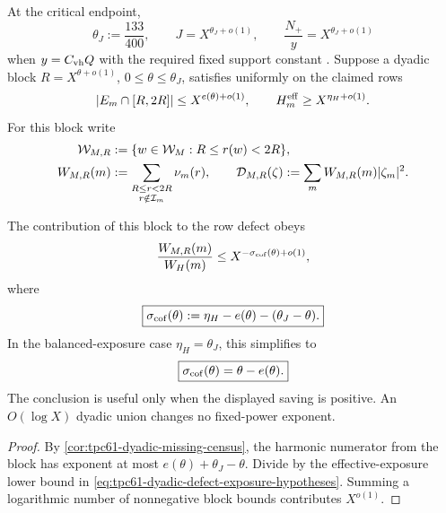 At the critical endpoint,
\begin{equation}
 \theta_J:=\frac{133}{400},
 \qquad
 J=X^{\theta_J+o(1)},
 \qquad
 \frac{N_+}{y}=X^{\theta_J+o(1)}
 \label{eq:tpc61-critical-J-exponent}
\end{equation}
when \(y=C_{\rm vh}Q\) with the required fixed support constant
\citep{WangTPC59}.  Suppose a dyadic block
\(R=X^{\theta+o(1)}\), \(0\le\theta\le\theta_J\), satisfies uniformly
on the claimed rows
\begin{equation}
 |E_m\cap[R,2R]|\le X^{e(\theta)+o(1)},
 \qquad
 H_m^{\rm eff}\ge X^{\eta_H+o(1)}.
 \label{eq:tpc61-dyadic-defect-exposure-hypotheses}
\end{equation}
For this block write
\begin{align}
 \mathcal W_{M,R}
 &:=\{w\in\mathcal W_M:R\le r(w)<2R\},
 \label{eq:tpc61-missing-block-carrier}\\
 W_{M,R}(m)
 &:=\sum_{\substack{R\le r<2R\\r\notin\mathcal I_m}}\nu_m(r),
 \qquad
 \mathcal D_{M,R}(\zeta):=\sum_mW_{M,R}(m)|\zeta_m|^2.
 \label{eq:tpc61-missing-block-diagonal}
\end{align}

\begin{corollary}
\label{cor:tpc61-dyadic-saving-exponent}
The contribution of this block to the row defect obeys
\begin{equation}
 \frac{W_{M,R}(m)}{W_H(m)}
 \le
 X^{-\sigma_{\rm cof}(\theta)+o(1)},
 \label{eq:tpc61-block-defect-saving}
\end{equation}
where
\begin{equation}
 \boxed{
 \sigma_{\rm cof}(\theta)
 :=\eta_H-e(\theta)-(\theta_J-\theta).}
 \label{eq:tpc61-general-cofactor-saving}
\end{equation}
In the balanced-exposure case \(\eta_H=\theta_J\), this simplifies to
\begin{equation}
 \boxed{
 \sigma_{\rm cof}(\theta)=\theta-e(\theta).}
 \label{eq:tpc61-balanced-cofactor-saving}
\end{equation}
The conclusion is useful only when the displayed saving is positive.
An \(O(\log X)\) dyadic union changes no fixed-power exponent.
\end{corollary}

\begin{proof}
By \cref{cor:tpc61-dyadic-missing-census}, the harmonic numerator from
the block has exponent at most
\(e(\theta)+\theta_J-\theta\).  Divide by the effective-exposure lower
bound in \eqref{eq:tpc61-dyadic-defect-exposure-hypotheses}.  Summing a
logarithmic number of nonnegative block bounds contributes \(X^{o(1)}\).
\end{proof}

